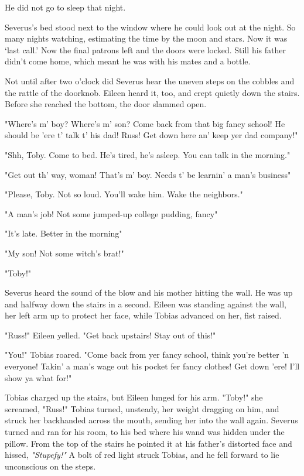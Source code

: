 He did not go to sleep that night.

Severus's bed stood next to the window where he could look out at the night. So many nights watching, estimating the time by the moon and stars. Now it was `last call.' Now the final patrons left and the doors were locked. Still his father didn't come home, which meant he was with his mates and a bottle.

Not until after two o'clock did Severus hear the uneven steps on the cobbles and the rattle of the doorknob. Eileen heard it, too, and crept quietly down the stairs. Before she reached the bottom, the door slammed open.

"Where's m' boy? Where's m' son? Come back from that big fancy school! He should be 'ere t' talk t' his dad! Russ! Get down here an' keep yer dad company!"

"Shh, Toby. Come to bed. He's tired, he's asleep. You can talk in the morning."

"Get out th' way, woman! That's m' boy. Needs t' be learnin' a man's business{\el}"

"Please, Toby. Not so loud. You'll wake him. Wake the neighbors."

"A man's job! Not some jumped-up college pudding, fancy{\el}"

"It's late. Better in the morning{\el}"

"My son! Not some witch's brat!"

"Toby!"

Severus heard the sound of the blow and his mother hitting the wall. He was up and halfway down the stairs in a second. Eileen was standing against the wall, her left arm up to protect her face, while Tobias advanced on her, fist raised.

"Russ!" Eileen yelled. "Get back upstairs! Stay out of this!"

"You!" Tobias roared. "Come back from yer fancy school, think you're better 'n everyone! Takin' a man's wage out his pocket fer fancy clothes! Get down 'ere! I'll show ya what for!"

Tobias charged up the stairs, but Eileen lunged for his arm. "Toby!" she screamed, "Russ!" Tobias turned, unsteady, her weight dragging on him, and struck her backhanded across the mouth, sending her into the wall again. Severus turned and ran for his room, to his bed where his wand was hidden under the pillow. From the top of the stairs he pointed it at his father's distorted face and hissed, \emph{"Stupefy!"} A bolt of red light struck Tobias, and he fell forward to lie unconscious on the steps.

